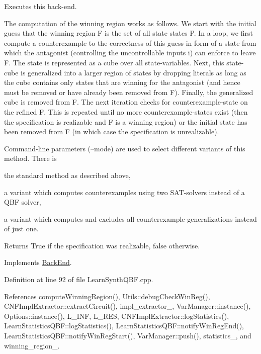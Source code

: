 Executes this back-\/end. 

The computation of the winning region works as follows. We start with the initial guess that the winning region F is the set of all state states P. In a loop, we first compute a counterexample to the correctness of this guess in form of a state from which the antagonist (controlling the uncontrollable inputs i) can enforce to leave F. The state is represented as a cube over all state-\/variables. Next, this state-\/cube is generalized into a larger region of states by dropping literals as long as the cube contains only states that are winning for the antagonist (and hence must be removed or have already been removed from F). Finally, the generalized cube is removed from F. The next iteration checks for counterexample-\/state on the refined F. This is repeated until no more counterexample-\/states exist (then the specification is realizable and F is a winning region) or the initial state has been removed from F (in which case the specification is unrealizable).

Command-\/line parameters (--mode) are used to select different variants of this method. There is 
\begin{DoxyItemize}
\item the standard method as described above, 
\item a variant which computes counterexamples using two S\-A\-T-\/solvers instead of a Q\-B\-F solver, 
\item a variant which computes and excludes all counterexample-\/generalizations instead of just one. 
\end{DoxyItemize}

\begin{DoxyReturn}{Returns}
True if the specification was realizable, false otherwise. 
\end{DoxyReturn}


Implements \hyperlink{classBackEnd_a099e717dc71e9cc2d838b1ca86340590}{Back\-End}.



Definition at line 92 of file Learn\-Synth\-Q\-B\-F.\-cpp.



References compute\-Winning\-Region(), Utils\-::debug\-Check\-Win\-Reg(), C\-N\-F\-Impl\-Extractor\-::extract\-Circuit(), impl\-\_\-extractor\-\_\-, Var\-Manager\-::instance(), Options\-::instance(), L\-\_\-\-I\-N\-F, L\-\_\-\-R\-E\-S, C\-N\-F\-Impl\-Extractor\-::log\-Statistics(), Learn\-Statistics\-Q\-B\-F\-::log\-Statistics(), Learn\-Statistics\-Q\-B\-F\-::notify\-Win\-Reg\-End(), Learn\-Statistics\-Q\-B\-F\-::notify\-Win\-Reg\-Start(), Var\-Manager\-::push(), statistics\-\_\-, and winning\-\_\-region\-\_\-.




